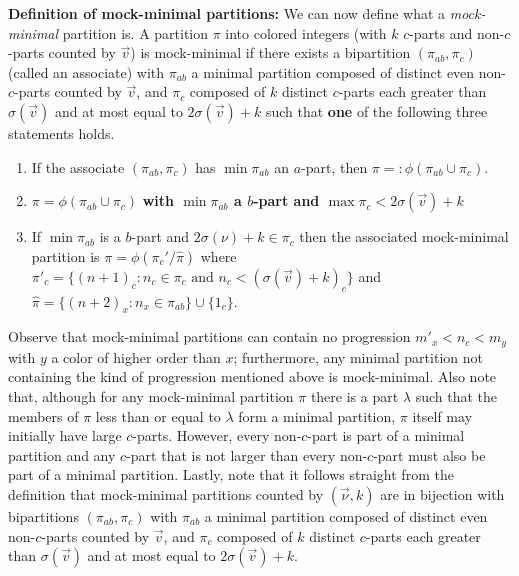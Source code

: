 \documentclass[12pt,a4paper]{amsart}
\theoremstyle{definition}
\theoremstyle{notation}
\theoremstyle{corollary}
\begin{document}
\textbf{Definition of mock-minimal partitions:} We can now define what a \textit{mock-minimal} partition is.
A partition $\pi$ into colored integers (with $k$ $c$-parts and non-$c$-parts counted by $\vec{v}$) is mock-minimal if there exists a bipartition $(\pi_{ab},\pi_c)$ (called an associate) with $\pi_{ab}$ a minimal partition composed of distinct even non-$c$-parts counted by $\vec{v}$, and $\pi_c$ composed of $k$ distinct $c$-parts each greater than $\sigma(\vec{v})$ and at most equal to $2\sigma(\vec{v})+k$ such that \textbf{one} of the following three statements holds. \begin{enumerate}[label=(\roman*)]
    \item If the associate $(\pi_{ab},\pi_c)$ has $\min\pi_{ab}$ an $a$-part, then $\pi=:\phi(\pi_{ab}\cup\pi_c)$. 
    \item $\pi=\phi(\pi_{ab}\cup\pi_c)$ \textbf{with $\min\pi_{ab}$ a $b$-part and $\max\pi_c<2\sigma(\vec{v})+k$}   
    \item If $\min\pi_{ab}$ is a $b$-part and $2\sigma(\nu)+k\in\pi_c$ then the associated mock-minimal partition is $\pi=\phi(\pi_c'/\hat{\pi})$ where $\pi'_c=\{(n+1)_c:n_c\in\pi_c \text{      and   } n_c<(\sigma(\vec{v})+k)_c\}$  and\\ $\hat{\pi}=\{(n+2)_x:n_x\in\pi_{ab} \}\cup\{1_c\}$.
 \end{enumerate}

Observe that mock-minimal partitions can contain no progression $m'_x<n_c<m_y$ with $y$ a color of higher order than $x$; furthermore, any minimal partition not containing the kind of progression mentioned above is mock-minimal. Also note that, although for any mock-minimal partition $\pi$ there is a part $\lambda$ such that the members of $\pi$ less than or equal to $\lambda$ form a minimal partition, $\pi$ itself may initially have large $c$-parts. However, every non-$c$-part is part of a minimal partition and any $c$-part that is not larger than every non-$c$-part must also be part of a minimal partition. Lastly, note that it follows straight from the definition that mock-minimal partitions counted by $(\vec{\nu},k)$ are in bijection with bipartitions $(\pi_{ab},\pi_c)$ with $\pi_{ab}$ a minimal partition composed of distinct even non-$c$-parts counted by $\vec{v}$, and $\pi_c$ composed of $k$ distinct $c$-parts each greater than $\sigma(\vec{v})$ and at most equal to $2\sigma(\vec{v})+k$. \\
\end{document}
